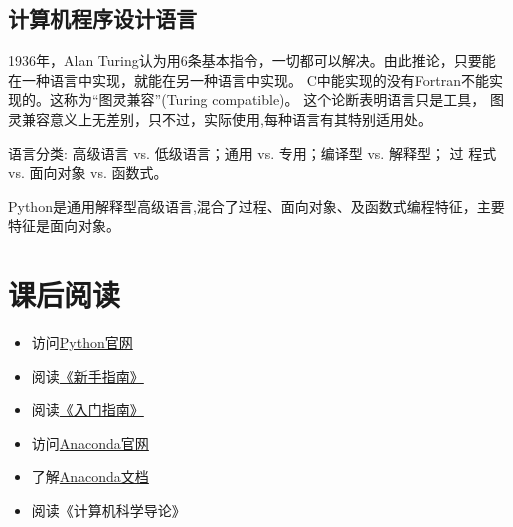 \subsection{计算机程序设计语言}

1936年，Alan Turing认为用6条基本指令，一切都可以解决。由此推论，只要能
在一种语言中实现，就能在另一种语言中实现。 C中能实现的没有Fortran不能实
现的。这称为“图灵兼容”(Turing compatible)。 这个论断表明语言只是工具，
图灵兼容意义上无差别，只不过，实际使用,每种语言有其特别适用处。

语言分类: 高级语言 vs. 低级语言；通用 vs. 专用；编译型 vs. 解释型； 过
程式 vs. 面向对象 vs. 函数式。

Python是通用解释型高级语言,混合了过程、面向对象、及函数式编程特征，主要
特征是面向对象。

\section{课后阅读}
\begin{itemize}
\item 访问\href{https://www.python.org}{Python官网}
\item 阅读\href{https://wiki.python.org/moin/BeginnersGuide}{《新手指南》}
\item 阅读\href{https://docs.python.org/3/tutorial/}{《入门指南》}
\item 访问\href{http://www.anaconda.com}{Anaconda官网}
\item 了解\href{https://docs.anaconda.com/}{Anaconda文档}
\item 阅读《计算机科学导论》
\end{itemize}